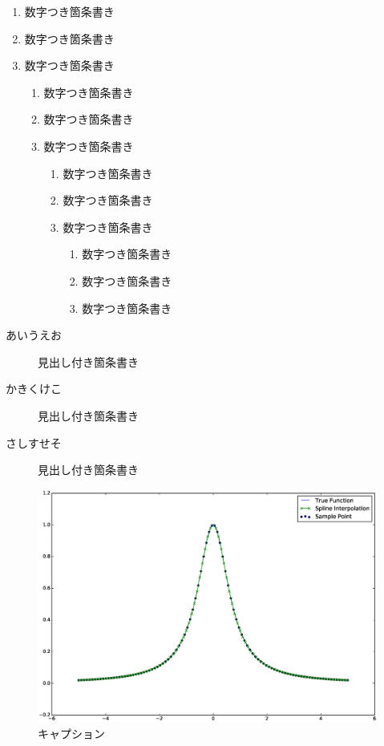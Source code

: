\documentclass[titlepage, a4paper, 11pt, dvipdfmx]{jsarticle}
\begin{document}
\begin{enumerate}
\item 数字つき箇条書き
\item 数字つき箇条書き
\item 数字つき箇条書き

\begin{enumerate}
\item 数字つき箇条書き
\item 数字つき箇条書き
\item 数字つき箇条書き

\begin{enumerate}
\item 数字つき箇条書き
\item 数字つき箇条書き
\item 数字つき箇条書き

\begin{enumerate}
\item 数字つき箇条書き
\item 数字つき箇条書き
\item 数字つき箇条書き
\end{enumerate}

\end{enumerate}

\end{enumerate}

\end{enumerate}

\begin{description}
\item[あいうえお] 見出し付き箇条書き
\item[かきくけこ] 見出し付き箇条書き
\item[さしすせそ] 見出し付き箇条書き
\end{description}

\begin{figure}[H]
\begin{center}%
\includegraphics[width=13.5cm]{./graphics/graph.eps}%
\caption{キャプション}
\label{Label}%
\end{center}
\end{figure}
\end{document}
